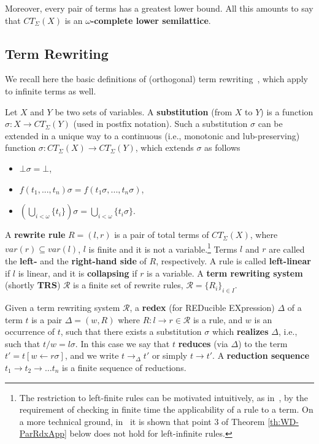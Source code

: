 \documentclass{eptcs}
\theoremstyle{plain}
\theoremstyle{definition}
\begin{document}
Moreover, every pair of terms has a greatest lower bound.  All this 
amounts 
to say that
$CT_\Sigma(X)$ is an {\bf $\omega$-complete lower semilattice}.



\subsection{Term Rewriting}
\label{ss:Term Rewriting}

We recall here the basic definitions of (orthogonal) term rewriting~\cite{HL:CORS1},  
which apply to infinite terms as well.

Let $X$ and $Y$ be
two sets of variables. A {\bf substitution} (from $X$ to $Y$) is
a function $\sigma: X \rightarrow CT_\Sigma(Y)$ (used in postfix 
notation). 
Such a substitution $\sigma$ can be extended in a unique way to
a continuous (i.e., monotonic and lub-preserving) function $\sigma : 
CT_\Sigma(X) \rightarrow CT_\Sigma(Y)$, which extends $\sigma$ as 
follows

\begin{itemize}

\item $\bot\sigma = \bot$,

\item $f(t_1, ..., t_n)\sigma = f(t_1\sigma,
..., t_n\sigma)$,

\item $\left(\bigcup_{i<\omega} \{t_i\}\right)\sigma = 
\bigcup_{i<\omega} 
\{t_i\sigma\}$.
\end{itemize}
  



\noindent
A {\bf rewrite rule} $R = (l, r)$ is a pair of total terms of 
$CT_\Sigma(X)$,
where $var(r) \subseteq var(l)$, $l$ is finite and it is not a 
variable.\footnote{The restriction to left-finite rules can be 
motivated 
intuitively, as in~\cite{KKSV:AGRS}, by the requirement of checking in 
finite 
time the applicability of a rule to a term. On a more technical 
ground, in~\cite{Cor:TRC} it is shown that point 3 of Theorem \ref{th:WD-ParRdxApp}
below does not hold for left-infinite rules.}
Terms $l$ and
$r$ are called the {\bf left-} and the {\bf right-hand side} of $R$, 
respectively. 
A rule is called {\bf left-linear} if  $l$ is linear, and it is {\bf 
collapsing} if $r$ is a variable. 
A {\bf term rewriting 
system} (shortly {\bf TRS})
$\mathcal{R}$ is a finite set of rewrite rules, $\mathcal{R} = \{R_i\}_{i 
\in 
I}$.

Given a term rewriting system
$\mathcal{R}$, a {\bf redex} (for REDucible EXpression)  $\Delta$ of a 
term 
$t$  is a pair 
$\Delta = (w, R)$ where $R: l \rightarrow r \in \mathcal{R}$ is a rule,  and
$w$ is an occurrence of $t$, such that there exists a substitution 
$\sigma$ which {\bf realizes} $\Delta$, i.e., 
such that $t/w = l\sigma$. In this case we say that $t$ {\bf reduces} 
(via $\Delta$) to 
the 
term $t' = t[w 
\leftarrow r\sigma]$, and we write  $t \rightarrow_\Delta 
t'$ or simply $t \rightarrow t'$. 
A {\bf reduction sequence} $t_1 \rightarrow t_2 \rightarrow \ldots
t_n$ is a finite sequence of reductions. 
\end{document}

